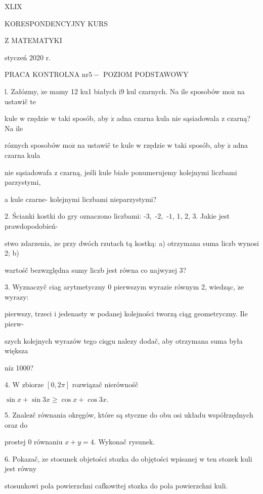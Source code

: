 \documentclass[a4paper,12pt]{article}
\begin{document}
XLIX

KORESPONDENCYJNY KURS

Z MATEMATYKI

styczeń 2020 r.

PRACA KONTROLNA $\mathrm{n}\mathrm{r} 5-$ POZIOM PODSTAWOWY

l. Załózmy, $\dot{\mathrm{z}}\mathrm{e}$ mamy 12 ku1 białych $\mathrm{i}9$ kul czarnych. Na ile sposobów $\mathrm{m}\mathrm{o}\dot{\mathrm{z}}$ na ustawič te

kule $\mathrm{w}$ rzędzie $\mathrm{w}$ taki sposób, aby $\dot{\mathrm{z}}$ adna czarna kula nie sąsiadowala $\mathrm{z}$ czarną? Na ile

róznych sposobów $\mathrm{m}\mathrm{o}\dot{\mathrm{z}}$ na ustawič te kule $\mathrm{w}$ rzędzie $\mathrm{w}$ taki sposób, aby $\dot{\mathrm{z}}$ adna czarna kula

nie sąsiadowafa $\mathrm{z}$ czarną, jeśli kule białe ponumerujemy kolejnymi liczbami parzystymi,

a kule czarne- kolejnymi liczbami nieparzystymi?

2. Ścianki kostki do gry oznaczono liczbami: -$3,$ -$2,$ -$1$, 1, 2, 3. Jakie jest prawdopodobień-

stwo zdarzenia, $\dot{\mathrm{z}}\mathrm{e}$ przy dwóch rzutach tą kostką: a) otrzymana suma liczb wynosi 2; b)

wartośč bezwzględna sumy liczb jest równa co najwyzej 3?

3. Wyznaczyč ciag arytmetyczny $0$ pierwszym wyrazie równym 2, wiedząc, $\dot{\mathrm{z}}\mathrm{e}$ wyrazy:

pierwszy, trzeci $\mathrm{i}$ jedenasty $\mathrm{w}$ podanej kolejności tworzą ciąg geometryczny. Ile pierw-

szych kolejnych wyrazów tego ciqgu nalezy dodač, aby otrzymana suma była większa

$\mathrm{n}\mathrm{i}\dot{\mathrm{z}}$ 1000?

4. $\mathrm{W}$ zbiorze $[0,2\pi]$ rozwiązač nierównośč

$\sin x+\sin 3x\geq\cos x+\cos 3x.$

5. Znalez$\acute{}$č równania okręgów, które są styczne do obu osi układu współrzędnych oraz do

prostej $0$ równaniu $x+y=4$. Wykonač rysunek.

6. Pokazač, $\dot{\mathrm{z}}\mathrm{e}$ stosunek objetości stozka do objętości wpisanej $\mathrm{w}$ ten stozek kuli jest równy

stosunkowi pola powierzchni cafkowitej stozka do pola powierzchni kuli.
\end{document}
